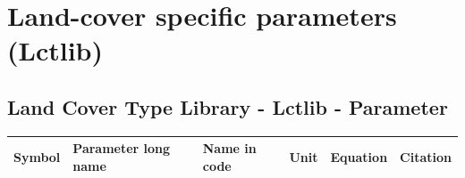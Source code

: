 \chapter{Land-cover specific parameters (Lctlib)}\label{ch:lctlib}


\section{Land Cover Type Library - Lctlib - Parameter}\label{sec:lctlib_parameter}

\begin{table}
\begin{tabularx}{\linewidth}{|c|X|l|c|c|c|} %
\hline 
Symbol & Parameter long name & Name in code & Unit & Equation & Citation \\ 
\hline 


\end{tabularx}
\end{table}
